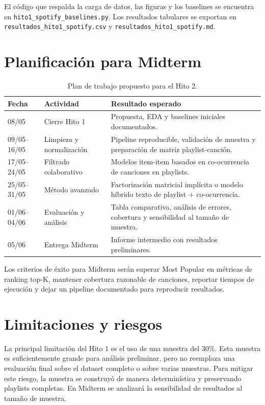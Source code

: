 \documentclass[10pt,letterpaper]{article}
\begin{document}
El código que respalda la carga de datos, las figuras y los baselines se encuentra en \texttt{hito1\_spotify\_baselines.py}. Los resultados tabulares se exportan en \texttt{resultados\_hito1\_spotify.csv} y \texttt{resultados\_hito1\_spotify.md}.

\section{Planificación para Midterm}

\begin{table}[h]
\centering
\small
\begin{tabular}{p{2.3cm}p{4.2cm}p{7.2cm}}
\toprule
\textbf{Fecha} & \textbf{Actividad} & \textbf{Resultado esperado}\\
\midrule
08/05 & Cierre Hito 1 & Propuesta, EDA y baselines iniciales documentados.\\
09/05--16/05 & Limpieza y normalización & Pipeline reproducible, validación de muestra y preparación de matriz playlist-canción.\\
17/05--24/05 & Filtrado colaborativo & Modelos item-item basados en co-ocurrencia de canciones en playlists.\\
25/05--31/05 & Método avanzado & Factorización matricial implícita o modelo híbrido texto de playlist + co-ocurrencia.\\
01/06--04/06 & Evaluación y análisis & Tabla comparativa, análisis de errores, cobertura y sensibilidad al tamaño de muestra.\\
05/06 & Entrega Midterm & Informe intermedio con resultados preliminares.\\
\bottomrule
\end{tabular}
\caption{Plan de trabajo propuesto para el Hito 2.}
\label{tab:plan}
\end{table}

Los criterios de éxito para Midterm serán superar Most Popular en métricas de ranking top-K, mantener cobertura razonable de canciones, reportar tiempos de ejecución y dejar un pipeline documentado para reproducir resultados.

\section{Limitaciones y riesgos}

La principal limitación del Hito 1 es el uso de una muestra del 30\%. Esta muestra es suficientemente grande para análisis preliminar, pero no reemplaza una evaluación final sobre el dataset completo o sobre varias muestras. Para mitigar este riesgo, la muestra se construyó de manera determinística y preservando playlists completas. En Midterm se analizará la sensibilidad de resultados al tamaño de muestra.
\end{document}
